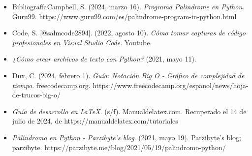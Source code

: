 \documentclass{report}
\begin{document}
\begin{itemize}
    \item BibliografíaCampbell, S. (2024, marzo 16). \textit{Programa Palindrome en Python}. Guru99. https://www.guru99.com/es/palindrome-program-in-python.html

    \item Code, S. [@salmcode2894]. (2022, agosto 10). \textit{Cómo tomar capturas de código profesionales en Visual Studio Code}. Youtube. 

    \item \textit{¿Cómo crear archivos de texto con Python?} (2021, mayo 11).

    \item Dux, C. (2024, febrero 1). \textit{Guía: Notación Big O - Gráfico de complejidad de tiempo}. freecodecamp.org. https://www.freecodecamp.org/espanol/news/hoja-de-trucos-big-o/

    \item \textit{Guía de desarrollo en LaTeX}. (s/f). Manualdelatex.com. Recuperado el 14 de julio de 2024, de https://manualdelatex.com/tutoriales

    \item \textit{Palíndromo en Python - Parzibyte’s blog}. (2021, mayo 19). Parzibyte’s blog; parzibyte. https://parzibyte.me/blog/2021/05/19/palindromo-python/
\end{itemize}

 
\end{document}
